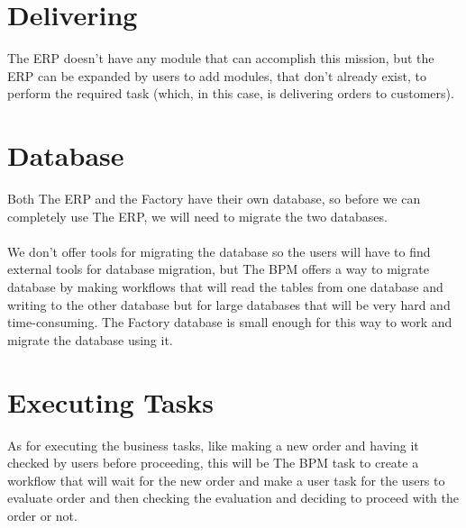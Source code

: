 \section{Delivering}
The ERP doesn’t have any module that can accomplish this mission, but the ERP can be expanded by
users to add modules, that don’t already exist, to perform the required task (which, in this case, is
delivering orders to customers).
\section{Database}
Both The ERP and the Factory have their own database, so before we can completely use The ERP,
we will need to migrate the two databases.\\\\
We don’t offer tools for migrating the database so the users will have to find external tools for
database migration, but The BPM offers a way to migrate database by making workflows that will
read the tables from one database and writing to the other database but for large databases that will be
very hard and time-consuming. The Factory database is small enough for this way to work and
migrate the database using it.
\section{Executing Tasks}
As for executing the business tasks, like making a new order and having it checked by users before
proceeding, this will be The BPM task to create a workflow that will wait for the new order and make
a user task for the users to evaluate order and then checking the evaluation and deciding to proceed
with the order or not.


